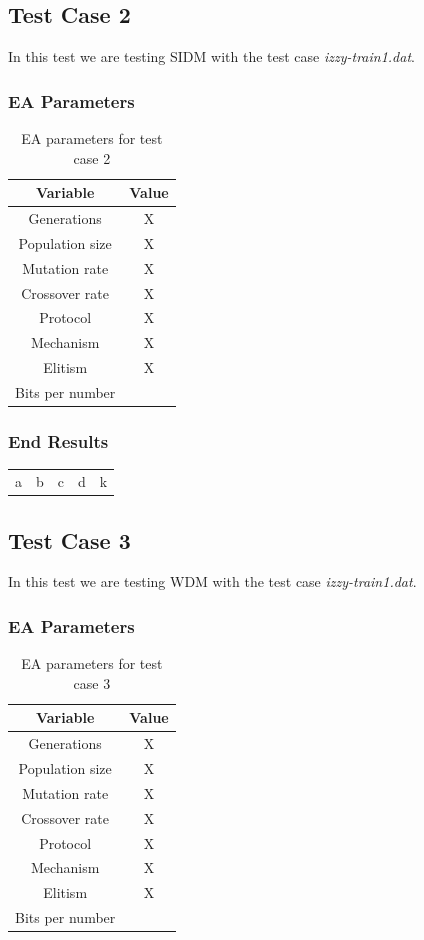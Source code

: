 \subsection{Test Case 2}\label{sec:test-case-2}
In this test we are testing SIDM with the test case
\textit{izzy-train1.dat}.
\subsubsection{EA Parameters}\label{sec:test-case-2-parameters}
\begin{table}
	\begin{tabular}{c c}
		Variable & Value \\
		\hline
		Generations & X \\
		\hline
		Population size & X \\
		\hline
		Mutation rate & X \\
		\hline
		Crossover rate & X \\
		\hline
		Protocol & X \\
		\hline
		Mechanism & X \\
		\hline
		Elitism & X \\
		\hline
		Bits per number & \\
	\end{tabular}
	\caption{EA parameters for test case 2}
\end{table}
\subsubsection{End Results}\label{sec:test-case-2-results}
\begin{table}
	\begin{tabular}{c c c c c}
		a & b & c & d & k \\
	\end{tabular}
\end{table}

\subsection{Test Case 3}\label{sec:test-case-3}
In this test we are testing WDM with the test case
\textit{izzy-train1.dat}.
\subsubsection{EA Parameters}\label{sec:test-case-3-parameters}
\begin{table}
	\begin{tabular}{c c}
		Variable & Value \\
		\hline
		Generations & X \\
		\hline
		Population size & X \\
		\hline
		Mutation rate & X \\
		\hline
		Crossover rate & X \\
		\hline
		Protocol & X \\
		\hline
		Mechanism & X \\
		\hline
		Elitism & X \\
		\hline
		Bits per number & \\
	\end{tabular}
	\caption{EA parameters for test case 3}
\end{table}
